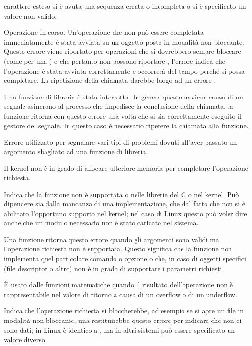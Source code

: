 \begin{basedescript}{\desclabelwidth{1.5cm}\desclabelstyle{\nextlinelabel}}
  carattere esteso si è avuta una sequenza errata o incompleta o si è
  specificato un valore non valido.
\item[\errcode{EINPROGRESS} \textit{Operation now in progress}.] Operazione in
  corso. Un'operazione che non può essere completata immediatamente è stata
  avviata su un oggetto posto in modalità non-bloccante. Questo errore viene
  riportato per operazioni che si dovrebbero sempre bloccare (come per una
  ) e che pertanto non possono riportare ,
  l'errore indica che l'operazione è stata avviata correttamente e occorrerà
  del tempo perché si possa completare. La ripetizione della chiamata darebbe
  luogo ad un errore .
\item[\errcode{EINTR} \textit{Interrupted function call}.] Una funzione di
  libreria è stata interrotta. In genere questo avviene causa di un segnale
  asincrono al processo che impedisce la conclusione della chiamata, la
  funzione ritorna con questo errore una volta che si sia correttamente
  eseguito il gestore del segnale. In questo caso è necessario ripetere la
  chiamata alla funzione.
\item[\errcode{EINVAL} \textit{Invalid argument}.] Errore utilizzato per
  segnalare vari tipi di problemi dovuti all'aver passato un argomento
  sbagliato ad una funzione di libreria.
\item[\errcode{ENOMEM} \textit{No memory available}.] Il kernel non è in grado
  di allocare ulteriore memoria per completare l'operazione richiesta.
\item[\errcode{ENOSYS} \textit{Function not implemented}.] Indica che la
  funzione non è supportata o nelle librerie del C o nel kernel. Può dipendere
  sia dalla mancanza di una implementazione, che dal fatto che non si è
  abilitato l'opportuno supporto nel kernel; nel caso di Linux questo può
  voler dire anche che un modulo necessario non è stato caricato nel sistema.
\item[\errcode{ENOTSUP} \textit{Not supported}.] Una funzione ritorna questo
  errore quando gli argomenti sono validi ma l'operazione richiesta non è
  supportata. Questo significa che la funzione non implementa quel particolare
  comando o opzione o che, in caso di oggetti specifici (file descriptor o
  altro) non è in grado di supportare i parametri richiesti.
\item[\errcode{ERANGE} \textit{Range error}.] È usato dalle funzioni
  matematiche quando il risultato dell'operazione non è rappresentabile nel
  valore di ritorno a causa di un overflow o di un underflow.
\item[\errcode{EWOULDBLOCK} \textit{Operation would block}.] Indica che
  l'operazione richiesta si bloccherebbe, ad esempio se si apre un file in
  modalità non bloccante, una  restituirebbe questo errore per
  indicare che non ci sono dati; in Linux è identico a , ma in
  altri sistemi può essere specificato un valore diverso.
\end{basedescript}


